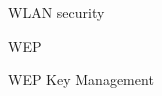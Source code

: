 \begin{section}{WLAN security}
\begin{subsection}{WEP}
\begin{subsubsection}{WEP Key Management}
    \end{subsubsection}

  \end{subsection}

\end{section}


